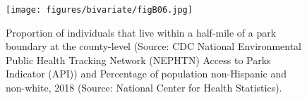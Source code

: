 \documentclass{article}
\begin{document}
\begin{figure}[!h] 
    \centering
    \caption{Proportion of individuals that live within a half-mile of a park boundary at the county-level (Source: CDC National Environmental Public Health Tracking Network (NEPHTN) Access to Parks Indicator (API)) and Percentage of population non-Hispanic and non-white, 2018 (Source: National Center for Health Statistics).}
    \texttt{[image: figures/bivariate/figB06.jpg]}
    \
\end{figure}
\FloatBarrier
\end{document}
